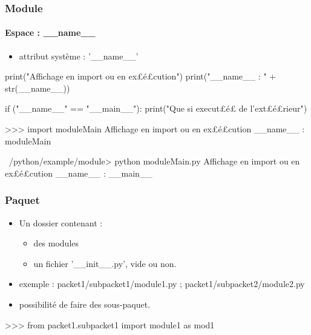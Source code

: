 \begin{frame}[fragile]
\frametitle{Module}
\framesubtitle{Espace : \_\_name\_\_}
\begin{itemize}
\item attribut système : '\_\_name\_\_'
\end{itemize}
\begin{python}
print("Affichage en import ou en ex£{\color{magenta}\'e}£cution")
print("__name__ : " + str(__name__))

if ("__name__" == "__main__"): 
    print("Que si execut£{\color{magenta}\'e}£ de l'ext£{\color{magenta}\'e}£rieur")
\end{python}
\begin{pythonConsole}
>>> import moduleMain
Affichage en import ou en ex£\'e£cution
__name__ : moduleMain
\end{pythonConsole}
\begin{shell}
~/python/example/module> python moduleMain.py
Affichage en import ou en ex£é£cution
__name__ : __main__
\end{shell}
\end{frame}
\begin{frame}[fragile]
\frametitle{Paquet}
\begin{itemize}
 \item Un dossier contenant : 
 \begin{itemize} 
  \item des modules
  \item un fichier '\_\_init\_\_.py', vide ou non.
 \end{itemize}
 \item exemple : packet1/subpacket1/module1.py ; packet1/subpacket2/module2.py 
 \item possibilité de faire des sous-paquet.  
\end{itemize}
\begin{pythonConsole}
>>> from packet1.subpacket1 import module1 as mod1
\end{pythonConsole}
\begin{center}
\end{center}
\end{frame}

